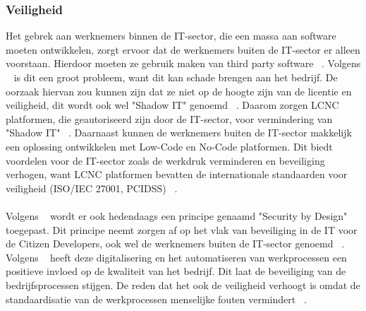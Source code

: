 \subsubsection{Veiligheid}
\label{subsec:veiligheid}
Het gebrek aan werknemers binnen de IT-sector, die een massa aan software moeten ontwikkelen, 
zorgt ervoor dat de werknemers buiten de IT-sector er alleen voorstaan. Hierdoor moeten ze gebruik maken van third party software ~\autocite{Yan2021}. 
Volgens ~\textcite{Yan2021} is dit een groot probleem, want dit kan schade brengen aan het bedrijf. 
De oorzaak hiervan zou kunnen zijn dat ze niet op de hoogte zijn van de licentie en veiligheid, dit wordt ook wel "Shadow IT" genoemd 
~\autocite{Rokis_2022}. Daarom zorgen LCNC platformen, die geautoriseerd zijn door de IT-sector, voor vermindering van "Shadow IT" ~\autocite{Yan2021}. 
Daarnaast kunnen de werknemers buiten de IT-sector makkelijk een oplossing ontwikkelen met Low-Code en No-Code platformen.
Dit biedt voordelen voor de IT-sector zoals de werkdruk verminderen en beveiliging verhogen, 
want LCNC platformen bevatten de internationale standaarden voor veiligheid (ISO/IEC 27001, PCIDSS) ~\autocite{Sufi_2023}.
\\
\\
Volgens ~\textcite{Sufi_2023} wordt er ook hedendaags een principe genaamd "Security by Design" toegepast. 
Dit principe neemt zorgen af op het vlak van beveiliging in de IT voor de Citizen Developers, ook wel de werknemers buiten de IT-sector genoemd ~\autocite{Sufi_2023}. 
Volgens ~\textcite{Elshan2023} heeft deze digitalisering en het automatiseren van werkprocessen een positieve invloed op de kwaliteit van het bedrijf. Dit 
laat de beveiliging van de bedrijfsprocessen stijgen. De reden dat het ook de veiligheid verhoogt is omdat de standaardisatie van de werkprocessen menselijke fouten vermindert ~\autocite{Elshan2023}.
